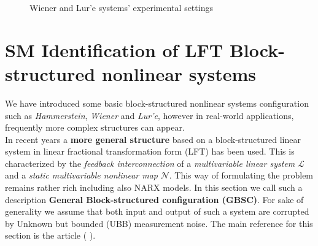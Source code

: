 \begin{figure}[h]
    \centering
    \quad 
    \caption{Wiener and Lur'e systems' experimental settings}
    \label{fig:others}
\end{figure}
 

\section{SM Identification of LFT Block-structured nonlinear systems}
We have introduced some basic block-structured nonlinear systems configuration such as \textit{Hammerstein}, \textit{Wiener} and \textit{Lur'e}, however in real-world applications, frequently more complex structures can appear. \\
In recent years a \textbf{more general structure} based on a block-structured linear system in linear fractional transformation form (LFT) has been used. This is characterized by the \textit{feedback interconnection} of a \textit{multivariable linear system} $\mathcal{L}$ and a \textit{static multivariable nonlinear map} $\mathcal{N}$. This way of formulating the problem remains rather rich including also NARX models. In this section we call such a description \textbf{General Block-structured configuration (GBSC)}. For sake of generality we assume that both input and output of such a system are corrupted by Unknown but bounded (UBB) measurement noise. The main reference for this section is the article \textit{}  (\citeauthor{cerone2021unified} \cite{cerone2021unified}).


